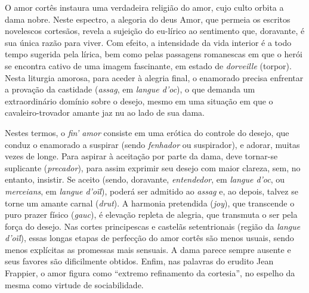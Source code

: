 O amor cortês instaura uma verdadeira religião do amor, cujo culto
orbita a dama nobre. Neste espectro, a alegoria do deus Amor, que
permeia os escritos novelescos cortesãos, revela a sujeição do
eu-lírico ao sentimento que, doravante, é sua única razão para viver.
Com efeito, a intensidade da vida interior é a todo tempo sugerida pela
lírica, bem como pelas passagens romanescas em que o herói se encontra
cativo de uma imagem fascinante, em estado de \textit{dorveille}
(torpor). Nesta liturgia amorosa, para aceder à alegria final, o
enamorado precisa enfrentar a provação da castidade (\textit{assag}, em
\textit{langue d’oc}), o que demanda um extraordinário domínio sobre o
desejo, mesmo em uma situação em que o cavaleiro-trovador amante jaz nu
ao lado de sua dama. 

Nestes termos, o \textit{fin’ amor} consiste em uma erótica do controle
do desejo, que conduz o enamorado a suspirar (sendo \textit{fenhador}
ou suspirador), e adorar, muitas vezes de longe. Para aspirar à
aceitação por parte da dama, deve tornar-se suplicante
(\textit{precador}), para assim exprimir seu desejo com maior clareza,
sem, no entanto, insistir. Se aceito (sendo, doravante,
\textit{entendedor}, em \textit{langue d’oc}, ou \textit{merceians}, em
\textit{langue d’oïl}), poderá ser admitido ao \textit{assag} e, ao
depois, talvez se torne um amante carnal (\textit{drut}). A harmonia
pretendida (\textit{joy}), que transcende o puro prazer físico
(\textit{gauc}), é elevação repleta de alegria, que transmuta o ser
pela força do desejo. Nas cortes principescas e castelãs setentrionais
(região da \textit{langue d’oïl}), essas longas etapas de perfecção do
amor cortês são menos usuais, sendo menos explícitas as promessas mais
sensuais. A dama parece sempre ausente e seus favores são dificilmente
obtidos. Enfim, nas palavras do erudito Jean Frappier, o amor figura
como “extremo refinamento da cortesia”, no espelho da mesma como
virtude de sociabilidade. 

